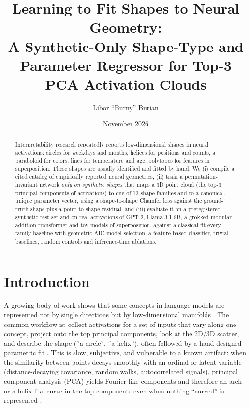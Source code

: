 \documentclass[10pt]{article}
\title{Learning to Fit Shapes to Neural Geometry:\\ A Synthetic-Only Shape-Type and Parameter Regressor for Top-3 PCA Activation Clouds}
\author{Libor ``Burny'' Burian}
\date{November 2026}
\begin{document}
\maketitle

\begin{abstract}
Interpretability research repeatedly reports low-dimensional shapes in neural activations: circles for weekdays and months, helices for positions and counts, a paraboloid for colors, lines for temperature and age, polytopes for features in superposition. These shapes are usually identified and fitted by hand. We (i) compile a cited catalog of empirically reported neural geometries, (ii) train a permutation-invariant network \emph{only on synthetic shapes} that maps a 3D point cloud (the top-3 principal components of activations) to one of 13 shape families and to a canonical, unique parameter vector, using a shape-to-shape Chamfer loss against the ground-truth shape plus a point-to-shape residual, and (iii) evaluate it on a preregistered synthetic test set and on real activations of GPT-2, Llama-3.1-8B, a grokked modular-addition transformer and toy models of superposition, against a classical fit-every-family baseline with geometric-AIC model selection, a feature-based classifier, trivial baselines, random controls and inference-time ablations.

\end{abstract}

\section{Introduction}
A growing body of work shows that some concepts in language models are represented not by single directions but by low-dimensional manifolds \citep{engels2025notall,bhalla2026sae,gurnee2025linebreaks}. The common workflow is: collect activations for a set of inputs that vary along one concept, project onto the top principal components, look at the 2D/3D scatter, and describe the shape (``a circle'', ``a helix''), often followed by a hand-designed parametric fit \citep{kantamneni2025trig}. This is slow, subjective, and vulnerable to a known artifact: when the similarity between points decays smoothly with an ordinal or latent variable (distance-decaying covariance, random walks, autocorrelated signals), principal component analysis (PCA) yields Fourier-like components and therefore an arch or a helix-like curve in the top components even when nothing ``curved'' is represented \citep{novembre2008horseshoe,diaconis2008horseshoes,antognini2018walks,shinn2023phantom}.
\end{document}
